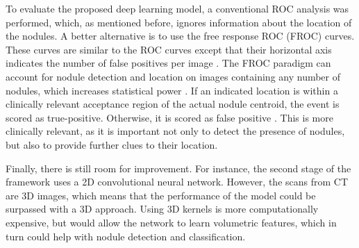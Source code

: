 \documentclass{article}
\begin{document}
To evaluate the proposed deep learning model, a conventional ROC analysis was performed, which, as mentioned before, ignores information about the location of the nodules. A better alternative is to use the free response ROC (FROC) curves. These curves are similar to the ROC curves except that their horizontal axis indicates the number of false positives per image \cite{oliver_2008}. The FROC paradigm can account for nodule detection and location on images containing any number of nodules, which increases statistical power \cite{FROC}. If an indicated location is within a clinically relevant acceptance region of the actual nodule centroid, the event is scored as true-positive. Otherwise, it is scored as false positive \cite{book}. This is more clinically relevant, as it is important not only to detect the presence of nodules, but also to provide further clues to their location.

Finally, there is still room for improvement. For instance, the second stage of the framework uses a 2D convolutional neural network. However, the scans from CT are 3D images, which means that the performance of the model could be surpassed with a 3D approach. Using 3D kernels is more computationally expensive, but would allow the network to learn volumetric features, which in turn could help with nodule detection and classification. 



\end{document}
